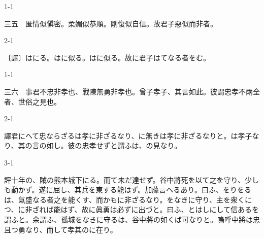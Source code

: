 \documentclass[tate,paper=b6j,jafontsize=9pt]{jlreq}
\begin{document}
\begin{azconvIndented}{1\zw}{-1\zw}

三五　匿情似愼密。柔媚似恭順。剛愎似自信。故君子惡似而非者。

\end{azconvIndented}
\begin{azconvIndented}{2\zw}{-1\zw}

〔譯〕はにる。はに似る。はに似る。故に君子はてなる者をむ。

\end{azconvIndented}

\begin{azconvIndented}{1\zw}{-1\zw}

三六　事君不忠非孝也、戰陳無勇非孝也。曾子孝子、其言如此。彼謂忠孝不兩全者、世俗之見也。

\end{azconvIndented}
\begin{azconvIndented}{2\zw}{-1\zw}

譯君にへて忠ならざるは孝に非ざるなり、に無きは孝に非ざるなりと。は孝子なり、其の言の如し。彼の忠孝せずと謂ふは、の見なり。

\end{azconvIndented}
\begin{azconvIndented}{3\zw}{-1\zw}

評十年の、賊の熊本城下にる。而て未だ達せず。谷中將死を以て之を守り、少しも動かず。遂に屈し、其兵を東する能はず。加藤言へるあり。曰ふ、をりをるは、氣盛なる者之を能くす、而かもに非ざるなり。をなきに守り、主を衆くにつ、に非ざれば能はず、故に眞勇は必ずに出づと。曰ふ、とはしにして信あるを謂ふと。余謂ふ、孤城をなきに守るは、谷中將の如くば可なりと。嗚呼中將は忠且つ勇なり、而して孝其のに在り。

\end{azconvIndented}
\end{document}
